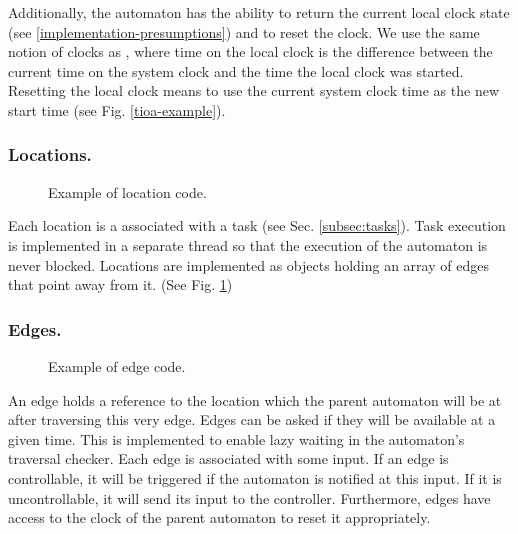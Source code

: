 Additionally, the automaton has the ability to return the current
local clock state (see \ref{implementation-presumptions}) and to
reset the clock. We use the same notion of clocks as \cite{amnell_code_2002},
where time on the local clock is the difference between the current
time on the system clock and the time the local clock was started.
Resetting the local clock means to use the current system clock time
as the new start time (see Fig. \ref{tioa-example}).

\subsubsection{Locations.}

\begin{figure}[t]

\caption{Example of location code.}
\label{location-example}
\end{figure}

Each location is a associated with a task (see Sec. \ref{subsec:tasks}). Task
execution is implemented in a separate thread so that the execution of the
automaton is never blocked. Locations are implemented as objects holding an
array of edges that point away from it. (See Fig. \ref{location-example})


\subsubsection{Edges.}
\label{subsubsec:edges}

\begin{figure}[t]

\caption{Example of edge code.}
\label{edge-example}
\end{figure}

An edge holds a reference to the location which the parent automaton
will be at after traversing this very edge. Edges can be asked if
they will be available at a given time. This is implemented to enable
lazy waiting in the automaton's traversal checker. Each edge is associated
with some input. If an edge is controllable, it will be triggered
if the automaton is notified at this input. If it is uncontrollable,
it will send its input to the controller. Furthermore, edges have
access to the clock of the parent automaton to reset it appropriately.

